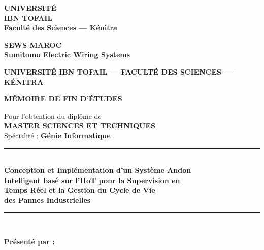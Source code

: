 ﻿%

\begin{titlepage}
\centering

\begin{minipage}[t]{0.45\textwidth}
    \centering
    \vspace{-0.5cm}
    {\Large\bfseries\color{sewesblu} UNIVERSITÉ\\IBN TOFAIL\\[0.3cm]
    {\normalsize Faculté des Sciences --- Kénitra}}
\end{minipage}
\hfill
\begin{minipage}[t]{0.45\textwidth}
    \centering
    \vspace{-0.5cm}
    {\Large\bfseries\color{sewesblu} SEWS MAROC\\[0.3cm]
    {\normalsize Sumitomo Electric Wiring Systems}}
\end{minipage}

\vspace{1.5cm}

{\large\bfseries UNIVERSITÉ IBN TOFAIL --- FACULTÉ DES SCIENCES --- KÉNITRA\\[0.5cm]}

{\Large\bfseries\color{sewesblu} MÉMOIRE DE FIN D'ÉTUDES\\[0.4cm]}

{\large Pour l'obtention du diplôme de\\[0.3cm]
\textbf{\Large MASTER SCIENCES ET TECHNIQUES}\\[0.2cm]
Spécialité : \textbf{Génie Informatique}\\[1.2cm]}

\rule{\linewidth}{0.6mm}\\[0.4cm]
{\LARGE\bfseries\color{darkblue} Conception et Implémentation d'un Système Andon\\[0.3cm]
Intelligent basé sur l'IIoT pour la Supervision en\\[0.3cm]
Temps Réel et la Gestion du Cycle de Vie\\[0.3cm]
des Pannes Industrielles\\[0.4cm]}
\rule{\linewidth}{0.6mm}\\[1.2cm]

\begin{flushleft}
\textbf{\large Présenté par :}\\[0.2cm]
\\[0.8cm]


\end{flushleft}
\end{titlepage}
